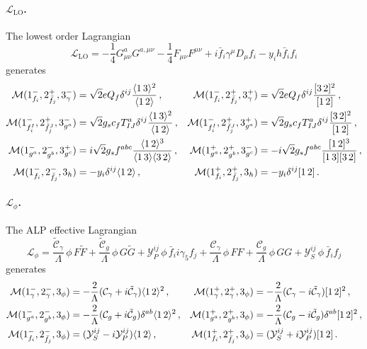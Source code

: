 \paragraph{$\mathcal L_{\text{LO}}$.}
The lowest order Lagrangian
\begin{equation}
    \mathcal L_{\text{LO}} = -\frac{1}{4}G_{\mu\nu}^a G^{a,\mu\nu}-\frac{1}{4}F_{\mu\nu}F^{\mu\nu}+i\bar f_i \gamma^\mu D_\mu f_i - y_i h \bar f_i f_i
\end{equation}
generates
\begin{align}
    \mathcal M(1^-_{f_i},2^+_{\bar f_j},3^-_\gamma) &= \sqrt 2 e Q_f \delta^{ij} \frac{\langle1\, 3 \rangle^2}{\langle1\, 2 \rangle}\,, &
     \mathcal M(1^-_{f_i},2^+_{\bar f_j},3^+_\gamma) &= \sqrt 2 e Q_f \delta^{ij}\frac{\lbrack 3\, 2 \rbrack^2}{\lbrack 1\, 2 \rbrack}\,, \\
     \mathcal M(1^-_{f_i^I},2^+_{\bar f_j^J},3^-_{g^a}) &= \sqrt 2 g_s c_f T^a_{IJ}\delta^{ij} \frac{\langle1\, 3 \rangle^2}{\langle1\, 2 \rangle}\,, &
     \mathcal M(1^-_{f_i^I},2^+_{\bar f_j^J},3^+_{g^a}) &= \sqrt 2 g_s c_f T^a_{IJ} \delta^{ij}\frac{\lbrack 3\, 2 \rbrack^2}{\lbrack 1\, 2 \rbrack}\,, \\
     \mathcal M(1^-_{g^a},2^-_{g^b},3^+_{g^c}) &= i\sqrt 2 g_s f^{abc}\frac{\langle1\, 2 \rangle^3}{\langle1\, 3 \rangle\langle3\, 2 \rangle}\,,  &
     \mathcal M(1^+_{g^a},2^+_{g^b},3^-_{g^c}) &=-i\sqrt 2 g_s f^{abc}\frac{\lbrack 1\, 2 \rbrack^3}{\lbrack 1\, 3 \rbrack\lbrack 3\, 2 \rbrack}\,,  \\
     \mathcal M(1^-_{f_i},2^-_{\bar f_j},3_h) &= - y_i\delta^{ij}\langle1\, 2 \rangle\,, &
     \mathcal M(1^+_{f_i},2^+_{\bar f_j},3_h) &= - y_i \delta^{ij} \lbrack 1\, 2 \rbrack \,.
\end{align}

\paragraph{$\mathcal L_{\phi}$.}
The ALP effective Lagrangian
\begin{equation}
    \mathcal{L}_\phi = 
    \frac{\tilde{\mathcal{C}}_\gamma}{\Lambda}\,\phi\, F\tilde F
    + \frac{\tilde{\mathcal{C}}_g}{\Lambda}\,\phi\, G\tilde G
    + \mathcal{Y}^{ij}_P\,\phi\, \bar{f}_i i\gamma_5 f_j 
     + \frac{\mathcal{C}_\gamma}{\Lambda}\,\phi\, FF
    + \frac{\mathcal{C}_g}{\Lambda}\,\phi\, GG
    + \mathcal{Y}^{ij}_S\,\phi\, \bar{f}_i f_j
\end{equation}
generates
\begin{align}
    \mathcal M(1^-_\gamma,2^-_\gamma,3_\phi) &= -\frac{2}{\Lambda}(\mathcal C_\gamma + i \tilde{\mathcal{C}}_\gamma)\langle1\, 2 \rangle^2\,, &
    \mathcal M(1^+_\gamma,2^+_\gamma,3_\phi) &= -\frac{2}{\Lambda}(\mathcal C_\gamma - i \tilde{\mathcal{C}}_\gamma)\lbrack 1\, 2 \rbrack^2\,, \\
    \mathcal M(1^-_{g^a},2^-_{g^b},3_\phi) &= -\frac{2}{\Lambda}(\mathcal C_g + i \tilde{\mathcal{C}}_g)\delta^{ab}\langle1\, 2 \rangle^2\,, &
    \mathcal M(1^+_{g^a},2^+_{g^b},3_\phi) &= -\frac{2}{\Lambda}(\mathcal C_g - i \tilde{\mathcal{C}}_g)\delta^{ab}\lbrack 1\, 2 \rbrack^2\,, \\
    \mathcal M(1^-_{f_i},2^-_{\bar f_j},3_\phi)&=(\mathcal Y_S^{ij}-i\mathcal Y_P^{ij})\langle1\, 2 \rangle\,, &
    \mathcal M(1^+_{f_i},2^+_{\bar f_j},3_\phi)&=(\mathcal Y_S^{ij}+i\mathcal Y_P^{ij})\lbrack 1\, 2 \rbrack \,.
\end{align}

